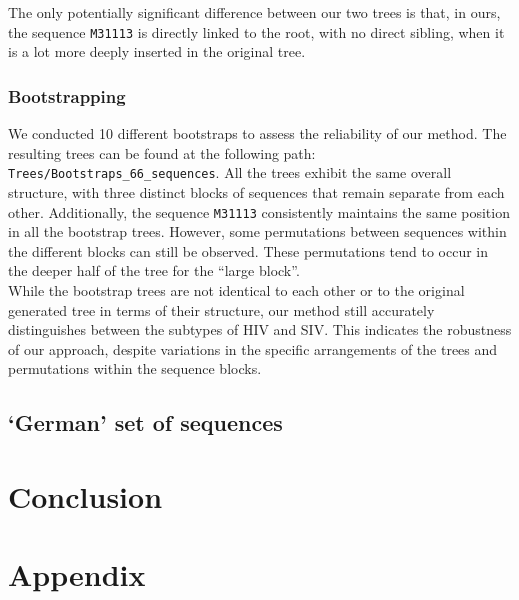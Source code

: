 \documentclass[english,13pt,a4paper]{article}
\theoremstyle{definition}
\theoremstyle{remark}
\theoremstyle{defstyle}
\begin{document}
The only potentially significant difference between our two trees is that, in ours, the sequence \texttt{M31113} is directly linked to the root, with no direct sibling, when it is a lot more deeply inserted in the original tree. 

\subsubsection{Bootstrapping}

We conducted 10 different bootstraps to assess the reliability of our method. The resulting trees can be found at the following path: \texttt{Trees/Bootstraps\_66\_sequences}. All the trees exhibit the same overall structure, with three distinct blocks of sequences that remain separate from each other. Additionally, the sequence \texttt{M31113} consistently maintains the same position in all the bootstrap trees. However, some permutations between sequences within the different blocks can still be observed. These permutations tend to occur in the deeper half of the tree for the ``large block''.\\

While the bootstrap trees are not identical to each other or to the original generated tree in terms of their structure, our method still accurately distinguishes between the subtypes of HIV and SIV. This indicates the robustness of our approach, despite variations in the specific arrangements of the trees and permutations within the sequence blocks.


\subsection{`German' set of sequences}


\section{Conclusion}


\newpage

\section*{Appendix}
\end{document}
